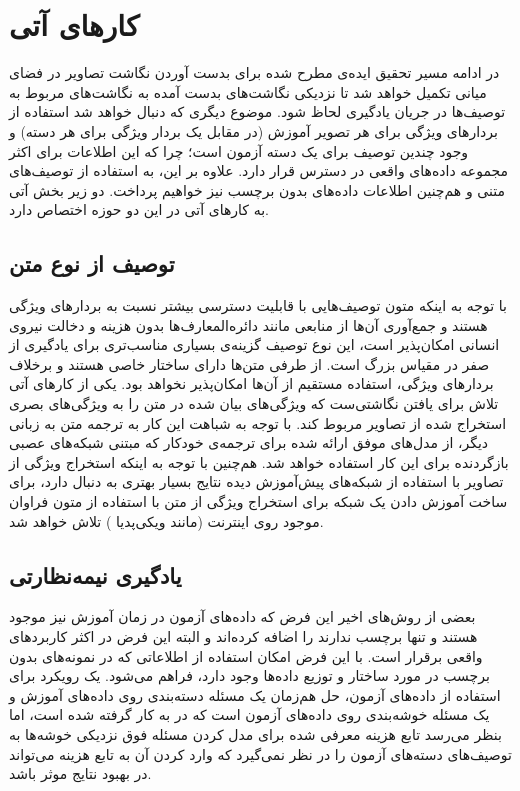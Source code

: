 \section{کارهای آتی}\label{future_works}
در ادامه مسیر تحقیق
ایده‌ی مطرح شده برای بدست آوردن نگاشت تصاویر در فضای میانی تکمیل خواهد شد تا نزدیکی نگاشت‌های بدست آمده به نگاشت‌های مربوط به توصیف‌ها در جریان یادگیری لحاظ شود. موضوع دیگری که دنبال خواهد شد استفاده از بردارهای ویژگی برای هر تصویر آموزش (در مقابل یک بردار ویژگی برای هر دسته) و وجود چندین توصیف برای یک دسته آزمون است؛ چرا که این اطلاعات برای اکثر مجموعه داده‌های واقعی در دسترس قرار دارد. علاوه بر این، به استفاده از توصیف‌های متنی و هم‌چنین اطلاعات داده‌های بدون برچسب نیز خواهیم پرداخت. دو زیر بخش آتی به کارهای آتی در این دو حوزه اختصاص دارد. 

\subsection{توصیف از نوع متن}\label{text_processing}
با توجه به اینکه متون توصیف‌هایی با قابلیت دسترسی بیشتر نسبت به بردارهای ویژگی هستند و جمع‌آوری آن‌ها از منابعی مانند دائره‌المعارف‌ها بدون هزینه و دخالت نیروی انسانی امکان‌پذیر است، این نوع توصیف گزینه‌ی بسیاری مناسب‌تری برای یادگیری از صفر در مقیاس بزرگ است. از طرفی متن‌ها دارای ساختار خاصی هستند و برخلاف بردارهای ویژگی، استفاده مستقیم از آن‌ها امکان‌پذیر نخواهد بود. یکی از کارهای آتی تلاش برای یافتن نگاشتی‌ست که ویژگی‌های بیان شده در متن را به ویژگی‌های بصری استخراج شده از تصاویر مربوط کند. با توجه به شباهت این کار به ترجمه متن به زبانی دیگر، از مدل‌های موفق ارائه شده برای ترجمه‌ی خودکار که مبتنی شبکه‌های عصبی بازگردنده 
برای این کار استفاده خواهد شد. هم‌چنین با توجه به اینکه  استخراج ویژگی از تصاویر با استفاده از شبکه‌های پیش‌آموزش دیده نتایج بسیار بهتری به دنبال دارد، برای ساخت آموزش دادن یک شبکه برای استخراج ویژگی از متن با استفاده از متون فراوان موجود روی اینترنت (مانند ویکی‌پدیا
) تلاش خواهد شد. 

\subsection{یادگیری نیمه‌نظارتی}
بعضی از روش‌های اخیر 
\cite{Kodirov2015, semi15, li15max}
 این فرض که داده‌های آزمون در زمان آموزش نیز موجود هستند و تنها برچسب ندارند را اضافه کرده‌اند و البته این فرض در اکثر کاربردهای واقعی برقرار است. با این فرض امکان استفاده  از اطلاعاتی که در نمونه‌های بدون برچسب در مورد ساختار و توزیع داده‌ها وجود دارد، فراهم می‌شود. یک رویکرد برای استفاده از داده‌های آزمون، حل هم‌زمان یک مسئله دسته‌بندی روی داده‌های آموزش و یک مسئله خوشه‌بندی روی داده‌های آزمون است که در \cite{li15max} به کار گرفته شده است، اما بنظر می‌رسد تابع هزینه معرفی شده برای مدل کردن مسئله فوق نزدیکی خوشه‌ها به توصیف‌های دسته‌های آزمون را در نظر نمی‌گیرد که وارد کردن آن به تابع هزینه می‌تواند در بهبود نتایج موثر باشد. 

